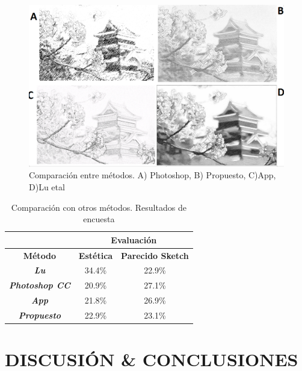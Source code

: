\documentclass[letterpaper, 10 pt, conference]{ieeeconf}  %
\begin{document}
\begin{figure}[H]
\centering
\includegraphics[width=\linewidth, scale=0.05]{images/2--43.png} 
\caption{Comparación entre métodos. A) Photoshop, B) Propuesto, C)App, D)Lu etal\cite{lu}}
    \label{comp}
    \end{figure}


\begin{table}[H]
\centering
\begin{tabular}{ccc}
\hline
\textbf{}                      & \multicolumn{2}{c}{\textbf{Evaluación}}                          \\ \hline
\textbf{Método}                & \textbf{Estética} & \multicolumn{1}{l}{\textbf{Parecido Sketch}} \\ \hline
\textit{\textbf{Lu}}           & 34.4\%            & 22.9\%                                       \\ \hline
\textit{\textbf{Photoshop CC}} & 20.9\%            & 27.1\%                                       \\ \hline
\textit{\textbf{App}}          & 21.8\%            & 26.9\%                                       \\ \hline
\textit{\textbf{Propuesto}}    & 22.9\%            & 23.1\%                                      
\end{tabular}

  \caption{Comparación con otros métodos. Resultados de encuesta}
  \label{res2}
\end{table}



\section{DISCUSIÓN \& CONCLUSIONES}
\end{document}
